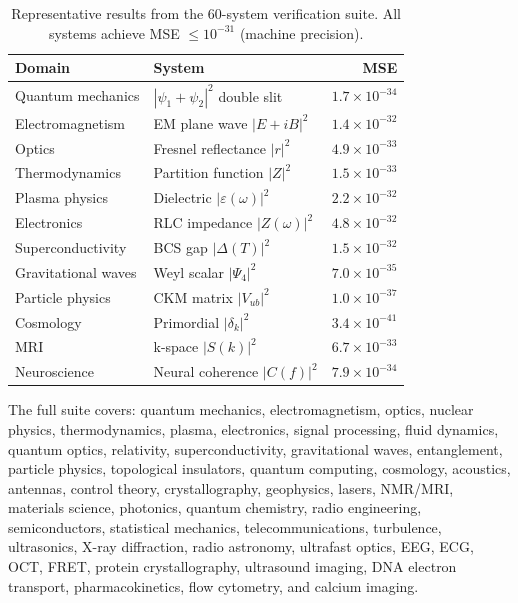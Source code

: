 \documentclass[11pt,a4paper]{article}
\begin{document}
\begin{table}[h]
\centering
\caption{Representative results from the 60-system verification suite.
All systems achieve MSE $\leq 10^{-31}$ (machine precision).}
\label{tab:physics}
\begin{tabular}{llr}
\hline
\textbf{Domain} & \textbf{System} & \textbf{MSE} \\
\hline
Quantum mechanics & $|\psi_1+\psi_2|^2$ double slit & $1.7\times10^{-34}$ \\
Electromagnetism  & EM plane wave $|E+iB|^2$        & $1.4\times10^{-32}$ \\
Optics            & Fresnel reflectance $|r|^2$      & $4.9\times10^{-33}$ \\
Thermodynamics    & Partition function $|Z|^2$       & $1.5\times10^{-33}$ \\
Plasma physics    & Dielectric $|\varepsilon(\omega)|^2$ & $2.2\times10^{-32}$ \\
Electronics       & RLC impedance $|Z(\omega)|^2$    & $4.8\times10^{-32}$ \\
Superconductivity & BCS gap $|\Delta(T)|^2$          & $1.5\times10^{-32}$ \\
Gravitational waves & Weyl scalar $|\Psi_4|^2$       & $7.0\times10^{-35}$ \\
Particle physics  & CKM matrix $|V_{ub}|^2$          & $1.0\times10^{-37}$ \\
Cosmology         & Primordial $|\delta_k|^2$        & $3.4\times10^{-41}$ \\
MRI               & k-space $|S(k)|^2$               & $6.7\times10^{-33}$ \\
Neuroscience      & Neural coherence $|C(f)|^2$      & $7.9\times10^{-34}$ \\
\hline
\end{tabular}
\end{table}

The full suite covers: quantum mechanics, electromagnetism, optics, nuclear physics,
thermodynamics, plasma, electronics, signal processing, fluid dynamics, quantum optics,
relativity, superconductivity, gravitational waves, entanglement, particle physics,
topological insulators, quantum computing, cosmology, acoustics, antennas, control theory,
crystallography, geophysics, lasers, NMR/MRI, materials science, photonics, quantum
chemistry, radio engineering, semiconductors, statistical mechanics, telecommunications,
turbulence, ultrasonics, X-ray diffraction, radio astronomy, ultrafast optics,
EEG, ECG, OCT, FRET, protein crystallography, ultrasound imaging, DNA electron transport,
pharmacokinetics, flow cytometry, and calcium imaging.
\end{document}
